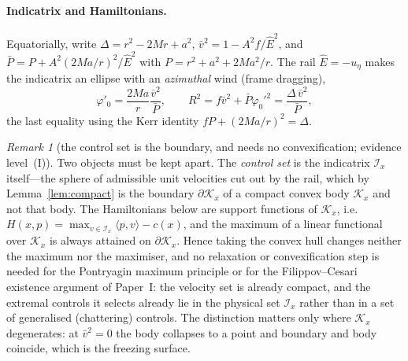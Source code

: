 \documentclass[12pt]{iopart}
\theoremstyle{plain}
\theoremstyle{definition}
\theoremstyle{remark}
\newtheorem{remark}[proposition]{Remark}
\newcommand{\Ehat}{\hat E}
\begin{document}
\paragraph{Indicatrix and Hamiltonians.} Equatorially, write
$\Delta=r^2-2Mr+a^2$, $\bar v^2=1-A^2f/\Ehat^2$, and
$\bar P=P+A^2(2Ma/r)^2/\Ehat^2$ with $P=r^2+a^2+2Ma^2/r$. The rail
$\Ehat=-u_\eta$ makes the indicatrix an ellipse with an \emph{azimuthal} wind
(frame dragging),
\begin{equation}
    \varphi'_0=\frac{2Ma}{r}\frac{\bar v^2}{\bar P},\qquad
    R^2=f\bar v^2+\bar P\varphi_0'^2=\frac{\Delta\,\bar v^2}{\bar P},
    \label{eq:tk-ind}
\end{equation}
the last equality using the Kerr identity $fP+(2Ma/r)^2=\Delta$.

\begin{remark}[the control set is the boundary, and needs no convexification;
evidence level~(I)]
\label{rmk:indicatrix}
Two objects must be kept apart. The \emph{control set} is the indicatrix
$\mathcal I_x$ itself---the sphere of admissible unit velocities cut out by the
rail, which by Lemma~\ref{lem:compact} is the boundary $\partial\mathcal K_x$ of
a compact convex body $\mathcal K_x$ and not that body. The Hamiltonians below
are support functions of $\mathcal K_x$, i.e.\ $H(x,p)=\max_{v\in\mathcal
I_x}\langle p,v\rangle-c(x)$, and the maximum of a linear functional over
$\mathcal K_x$ is always attained on $\partial\mathcal K_x$. Hence taking the
convex hull changes neither the maximum nor the maximiser, and no relaxation or
convexification step is needed for the Pontryagin maximum principle or for the
Filippov--Cesari existence argument of Paper~I: the velocity set is already
compact, and the extremal controls it selects already lie in the physical set
$\mathcal I_x$ rather than in a set of generalised (chattering) controls. The
distinction matters only where $\mathcal K_x$ degenerates: at $\bar v^2=0$ the
body collapses to a point and boundary and body coincide, which is the freezing
surface.
\end{remark}
\end{document}
